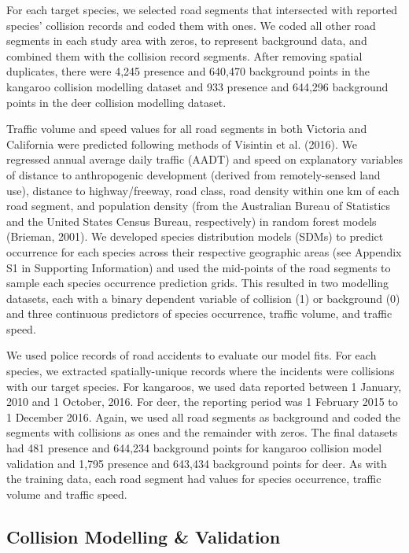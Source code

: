For each target species, we selected road segments that intersected with reported species’ collision records and coded them with ones. We coded all other road segments in each study area with zeros, to represent background data, and combined them with the collision record segments.  After removing spatial duplicates, there were 4,245 presence and 640,470 background points in the kangaroo collision modelling dataset and 933 presence and 644,296 background points in the deer collision modelling dataset.

Traffic volume and speed values for all road segments in both Victoria and California were predicted following methods of Visintin et al. (2016).  We regressed annual average daily traffic (AADT) and speed on explanatory variables of distance to anthropogenic development (derived from remotely-sensed land use), distance to highway/freeway, road class, road density within one km of each road segment, and population density (from the Australian Bureau of Statistics and the United States Census Bureau, respectively) in random forest models (Brieman, 2001). We developed species distribution models (SDMs) to predict occurrence for each species across their respective geographic areas (see Appendix S1 in Supporting Information) and used the mid-points of the road segments to sample each species occurrence prediction grids. This resulted in two modelling datasets, each with a binary dependent variable of collision (1) or background (0) and three continuous predictors of species occurrence, traffic volume, and traffic speed.  

We used police records of road accidents to evaluate our model fits.  For each species, we extracted spatially-unique records where the incidents were collisions with our target species.  For kangaroos, we used data reported between 1 January, 2010 and 1 October, 2016. For deer, the reporting period was 1 February 2015 to 1 December 2016.  Again, we used all road segments as background and coded the segments with collisions as ones and the remainder with zeros. The final datasets had 481 presence and 644,234 background points for kangaroo collision model validation and 1,795 presence and 643,434 background points for deer. As with the training data, each road segment had values for species occurrence, traffic volume and traffic speed.

\subsection{Collision Modelling \& Validation}

